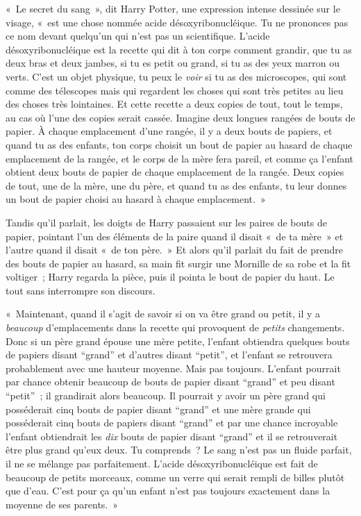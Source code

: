 «~Le secret du sang~», dit Harry Potter, une expression intense dessinée sur le visage, «~est une chose nommée acide désoxyribonucléique.
Tu ne prononces pas ce nom devant quelqu'un qui n'est pas un scientifique.
L'acide désoxyribonucléique est la recette qui dit à ton corps comment grandir, que tu as deux bras et deux jambes, si tu es petit ou grand, si tu as des yeux marron ou verts.
C'est un objet physique, tu peux le \emph{voir} si tu as des microscopes, qui sont comme des télescopes mais qui regardent les choses qui sont très petites au lieu des choses très lointaines.
Et cette recette a deux copies de tout, tout le temps, au cas où l'une des copies serait cassée.
Imagine deux longues rangées de bouts de papier.
À chaque emplacement d'une rangée, il y a deux bouts de papiers, et quand tu as des enfants, ton corps choisit un bout de papier au hasard de chaque emplacement de la rangée, et le corps de la mère fera pareil, et comme ça l'enfant obtient deux bouts de papier de chaque emplacement de la rangée.
Deux copies de tout, une de la mère, une du père, et quand tu as des enfants, tu leur donnes un bout de papier choisi au hasard à chaque emplacement.~»

Tandis qu'il parlait, les doigts de Harry passaient sur les paires de bouts de papier, pointant l'un des éléments de la paire quand il disait «~de ta mère~» et l'autre quand il disait «~de ton père.~»
Et alors qu'il parlait du fait de prendre des bouts de papier au hasard, sa main fit surgir une Mornille de sa robe et la fit voltiger~; Harry regarda la pièce, puis il pointa le bout de papier du haut.
Le tout sans interrompre son discours.

«~Maintenant, quand il s'agit de savoir si on va être grand ou petit, il y a \emph{beaucoup} d'emplacements dans la recette qui provoquent de \emph{petits} changements.
Donc si un père grand épouse une mère petite, l'enfant obtiendra quelques bouts de papiers disant “grand” et d'autres disant “petit”, et l'enfant se retrouvera probablement avec une hauteur moyenne.
Mais pas toujours.
L'enfant pourrait par chance obtenir beaucoup de bouts de papier disant “grand” et peu disant “petit”~; il grandirait alors beaucoup.
Il pourrait y avoir un père grand qui posséderait cinq bouts de papier disant “grand” et une mère grande qui posséderait cinq bouts de papiers disant “grand” et par une chance incroyable l'enfant obtiendrait les \emph{dix} bouts de papier disant “grand” et il se retrouverait être plus grand qu'eux deux.
Tu comprends~?
Le sang n'est pas un fluide parfait, il ne se mélange pas parfaitement.
L'acide désoxyribonucléique est fait de beaucoup de petits morceaux, comme un verre qui serait rempli de billes plutôt que d'eau.
C'est pour ça qu'un enfant n'est pas toujours exactement dans la moyenne de ses parents.~»

